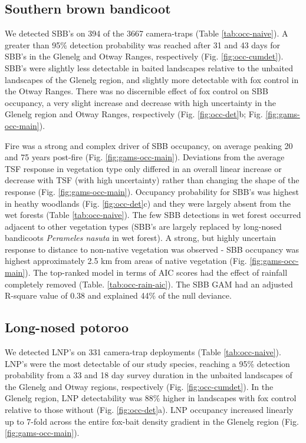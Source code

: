 \documentclass[11pt,a4paper,titlepage,twoside,openright]{style/unimelbthesis}
\begin{document}
\begin{mainmatter}
\hypertarget{southern-brown-bandicoot-1}{%
\subsection{Southern brown bandicoot}\label{southern-brown-bandicoot-1}}

We detected SBB's on 394 of the 3667 camera-traps (Table \ref{tab:occ-naive}). A greater than 95\% detection probability was reached after 31 and 43 days for SBB's in the Glenelg and Otway Ranges, respectively (Fig. \ref{fig:occ-cumdet}). SBB's were slightly less detectable in baited landscapes relative to the unbaited landscapes of the Glenelg region, and slightly more detectable with fox control in the Otway Ranges. There was no discernible effect of fox control on SBB occupancy, a very slight increase and decrease with high uncertainty in the Glenelg region and Otway Ranges, respectively (Fig. \ref{fig:occ-det}b; Fig. \ref{fig:gams-occ-main}).

Fire was a strong and complex driver of SBB occupancy, on average peaking 20 and 75 years post-fire (Fig. \ref{fig:gams-occ-main}). Deviations from the average TSF response in vegetation type only differed in an overall linear increase or decrease with TSF (with high uncertainty) rather than changing the shape of the response (Fig. \ref{fig:gams-occ-main}). Occupancy probability for SBB's was highest in heathy woodlands (Fig. \ref{fig:occ-det}c) and they were largely absent from the wet forests (Table \ref{tab:occ-naive}). The few SBB detections in wet forest occurred adjacent to other vegetation types (SBB's are largely replaced by long-nosed bandicoots \emph{Perameles nasuta} in wet forest). A strong, but highly uncertain response to distance to non-native vegetation was observed - SBB occupancy was highest approximately 2.5 km from areas of native vegetation (Fig. \ref{fig:gams-occ-main}). The top-ranked model in terms of AIC scores had the effect of rainfall completely removed (Table. \ref{tab:occ-rain-aic}). The SBB GAM had an adjusted R-square value of 0.38 and explained 44\% of the null deviance.

\hypertarget{long-nosed-potoroo-1}{%
\subsection{Long-nosed potoroo}\label{long-nosed-potoroo-1}}

We detected LNP's on 331 camera-trap deployments (Table \ref{tab:occ-naive}). LNP's were the most detectable of our study species, reaching a 95\% detection probability from a 33 and 18 day survey duration in the unbaited landscapes of the Glenelg and Otway regions, respectively (Fig. \ref{fig:occ-cumdet}). In the Glenelg region, LNP detectability was 88\% higher in landscapes with fox control relative to those without (Fig. \ref{fig:occ-det}a). LNP occupancy increased linearly up to 7-fold across the entire fox-bait density gradient in the Glenelg region (Fig. \ref{fig:gams-occ-main}).


\end{mainmatter}
\end{document}
